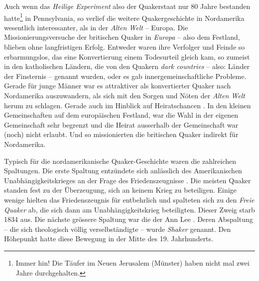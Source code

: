 \medskip

Auch wenn das \textit{Heilige Experiment} also der Quakerstaat nur 80 Jahre
bestanden hatte\footnote{Immer hin! Die Täufer im Neuen Jerusalem (Münster)
  haben
nicht mal zwei Jahre durchgehalten.} in Pennsylvania, so verlief die weitere
Quakergeschichte in Nordamerika wesentlich interessanter, als in der
\textit{Alten
Welt} -- Europa. Die Missionierungsversuche  der britischen
Quaker in
\textit{Europa}  -- also dem Festland, blieben ohne
langfristigen Erfolg.
Entweder waren ihre Verfolger  und Feinde so erbarmungslos,
das eine
Konvertierung einem Todesurteil gleich kam, so zumeist in den katholischen
Ländern, die von den Quakern \textit{dark countries}  -- also: Länder der
Finsternis -- genannt wurden, oder es gab innergemeinschaftliche Probleme.
Gerade
für junge Männer war es attraktiver als konvertierter Quaker nach Nordamerika
auszuwandern, als sich mit den Sorgen und Nöten der \textit{Alten Welt} herum
zu
schlagen. Gerade auch im Hinblick auf Heiratschancen . In den
kleinen
Gemeinschaften auf dem europäischen Festland, war die Wahl in der eigenen
Gemeinschaft sehr begrenzt und die Heirat ausserhalb der Gemeinschaft war (noch)
nicht erlaubt. Und so missionierten die britischen Quaker indirekt für
Nordamerika.

\medskip

Typisch für die nordamerikanische Quaker-Geschichte waren die zahlreichen
Spaltungen. Die erste Spaltung  entzündete sich anlässlich des
Amerikanischen
Unabhängigkeitskrieges an der Frage des Friedenszeugnisse
. Die meisten Quaker
standen fest zu der Überzeugung, sich an keinem Krieg  zu
beteiligen. Einige
wenige hielten das Friedenszeugnis für entbehrlich und spalteten sich zu den
\textit{Freie Quaker}   ab,
die sich dann am Unabhängigkeitskrieg 
beteiligten. Dieser Zweig starb 1834 aus. Die nächste grössere Spaltung war die
der Ann Lee . Deren Abspaltung -- die sich theologisch
völlig verselbständigte --
wurde \textit{Shaker}  genannt. Den Höhepunkt hatte
diese Bewegung in der Mitte
des 19. Jahrhunderts.

\medskip

